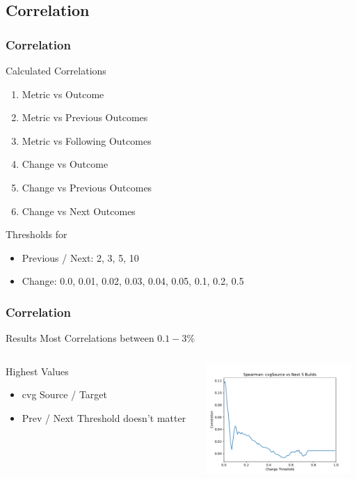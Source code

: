 \documentclass{beamer}
\begin{document}
\subsection{Correlation}
\begin{frame}
	\frametitle{Correlation}
	
	Calculated Correlations
	\begin{enumerate}
		\item Metric vs Outcome
		\item Metric vs Previous Outcomes
		\item Metric vs Following Outcomes
		\item Change vs Outcome
		\item Change vs Previous Outcomes
		\item Change vs Next Outcomes
	\end{enumerate}
	
	Thresholds for
	\begin{itemize}
		\item Previous / Next: 2, 3, 5, 10
		\item Change: 0.0, 0.01, 0.02, 0.03, 0.04, 0.05, 0.1, 0.2, 0.5
	\end{itemize}
	
\end{frame}

\begin{frame}
	\frametitle{Correlation}
	
	\begin{block}{Results}
		Most Correlations between $0.1- 3\%$
	\end{block}
	\begin{columns}
		\begin{column}{0.5\textwidth}
			Highest Values
			\begin{itemize}
				\item cvg Source / Target
				\item Prev / Next Threshold doesn't matter
			\end{itemize}
		\end{column}
		\begin{column}{0.5\textwidth}
		\begin{center}
			\includegraphics[width=5.5cm]{assets/cvgSourceCorrPlot.pdf}
		\end{center}
		\end{column}
	\end{columns}
	
	
\end{frame}
\end{document}
